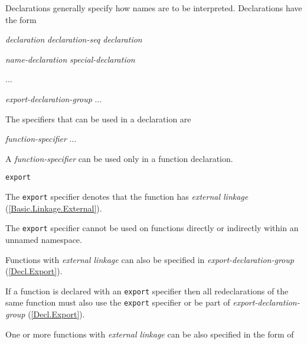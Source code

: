 \p Declarations generally specify how names are to be interpreted. Declarations have the form
\begin{grammar}
  \br
  \textit{declaration}\br
  \textit{declaration-seq declaration}

  \br
  \textit{name-declaration}\br
  \textit{special-declaration}

  \br
  ...

  \br
  \textit{export-declaration-group}\br
  ...
\end{grammar}

\p The specifiers that can be used in a declaration are
\begin{grammar}
  \br
  \textit{function-specifier}\br
  ...
\end{grammar}


\p A \textit{function-specifier} can be used only in a function declaration.

\begin{grammar}
  \br
  \texttt{export}\br
\end{grammar}

\p The \texttt{export} specifier denotes that the function has \textit{external linkage} (\ref{Basic.Linkage.External}).

\p The \texttt{export} specifier cannot be used on functions directly or indirectly within an unnamed namespace.

\p Functions with \textit{external linkage} can also be specified in \textit{export-declaration-group} (\ref{Decl.Export}).

\p If a function is declared with an \texttt{export} specifier then all redeclarations of the same function must also use the \texttt{export} specifier or be part of \textit{export-declaration-group} (\ref{Decl.Export}).



\p One or more functions with \textit{external linkage} can be also specified in the form of

